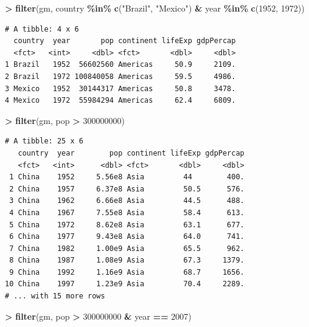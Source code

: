 \documentclass[
]{krantz}
\makeatletter
\newenvironment{Shaded}{\begin{snugshade}}{\end{snugshade}}
\newcommand{\DecValTok}[1]{\textcolor[rgb]{0.06,0.06,0.06}{#1}}
\newcommand{\KeywordTok}[1]{\textcolor[rgb]{0.27,0.27,0.27}{\textbf{#1}}}
\newcommand{\NormalTok}[1]{#1}
\newcommand{\OperatorTok}[1]{\textcolor[rgb]{0.43,0.43,0.43}{\textbf{#1}}}
\newcommand{\StringTok}[1]{\textcolor[rgb]{0.5,0.5,0.5}{#1}}
\newenvironment{kframe}{%
\medskip{}
\setlength{\fboxsep}{.8em}
 \def\at@end@of@kframe{}%
 \ifinner\ifhmode%
  \def\at@end@of@kframe{\end{minipage}}%
  \begin{minipage}{\columnwidth}%
 \fi\fi%
 \def\FrameCommand##1{\hskip\@totalleftmargin \hskip-\fboxsep
 \colorbox{shadecolor}{##1}\hskip-\fboxsep
     \hskip-\linewidth \hskip-\@totalleftmargin \hskip\columnwidth}%
 \MakeFramed {\advance\hsize-\width
   \@totalleftmargin\z@ \linewidth\hsize
   \@setminipage}}%
 {\par\unskip\endMakeFramed%
 \at@end@of@kframe}
\renewenvironment{Shaded}{\begin{kframe}}{\end{kframe}}
\makeatother
\begin{document}
\begin{Shaded}
\begin{Highlighting}[]
\OperatorTok{\textgreater{}}\StringTok{ }\KeywordTok{filter}\NormalTok{(gm, country }\OperatorTok{\%in\%}\StringTok{ }\KeywordTok{c}\NormalTok{(}\StringTok{"Brazil"}\NormalTok{, }\StringTok{"Mexico"}\NormalTok{) }\OperatorTok{\&}\StringTok{ }\NormalTok{year }\OperatorTok{\%in\%}\StringTok{ }\KeywordTok{c}\NormalTok{(}\DecValTok{1952}\NormalTok{, }\DecValTok{1972}\NormalTok{))}
\end{Highlighting}
\end{Shaded}

\begin{verbatim}
# A tibble: 4 x 6
  country  year       pop continent lifeExp gdpPercap
  <fct>   <int>     <dbl> <fct>       <dbl>     <dbl>
1 Brazil   1952  56602560 Americas     50.9     2109.
2 Brazil   1972 100840058 Americas     59.5     4986.
3 Mexico   1952  30144317 Americas     50.8     3478.
4 Mexico   1972  55984294 Americas     62.4     6809.
\end{verbatim}

\begin{Shaded}
\begin{Highlighting}[]
\OperatorTok{\textgreater{}}\StringTok{ }\KeywordTok{filter}\NormalTok{(gm, pop }\OperatorTok{\textgreater{}}\StringTok{ }\DecValTok{300000000}\NormalTok{)}
\end{Highlighting}
\end{Shaded}

\begin{verbatim}
# A tibble: 25 x 6
   country  year        pop continent lifeExp gdpPercap
   <fct>   <int>      <dbl> <fct>       <dbl>     <dbl>
 1 China    1952     5.56e8 Asia         44        400.
 2 China    1957     6.37e8 Asia         50.5      576.
 3 China    1962     6.66e8 Asia         44.5      488.
 4 China    1967     7.55e8 Asia         58.4      613.
 5 China    1972     8.62e8 Asia         63.1      677.
 6 China    1977     9.43e8 Asia         64.0      741.
 7 China    1982     1.00e9 Asia         65.5      962.
 8 China    1987     1.08e9 Asia         67.3     1379.
 9 China    1992     1.16e9 Asia         68.7     1656.
10 China    1997     1.23e9 Asia         70.4     2289.
# ... with 15 more rows
\end{verbatim}

\begin{Shaded}
\begin{Highlighting}[]
\OperatorTok{\textgreater{}}\StringTok{ }\KeywordTok{filter}\NormalTok{(gm, pop }\OperatorTok{\textgreater{}}\StringTok{ }\DecValTok{300000000} \OperatorTok{\&}\StringTok{ }\NormalTok{year }\OperatorTok{==}\StringTok{ }\DecValTok{2007}\NormalTok{)}
\end{Highlighting}
\end{Shaded}
\end{document}
